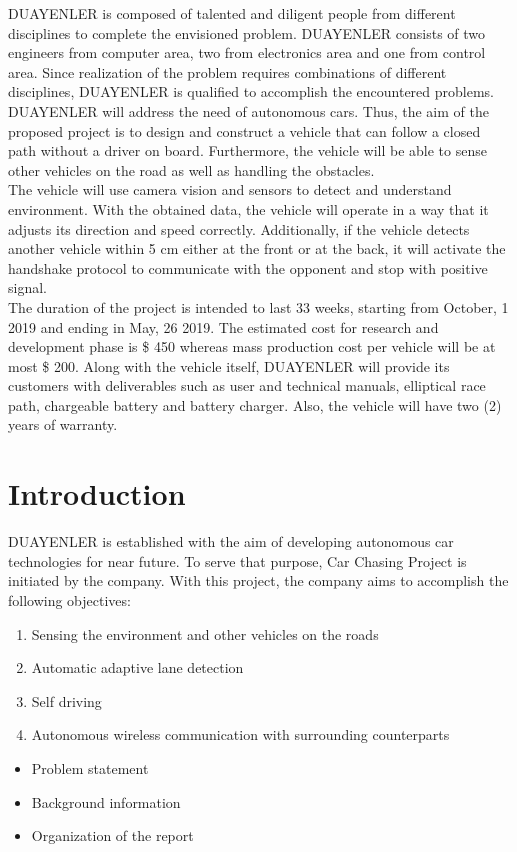 \documentclass[a4paper,12pt]{article}
\begin{document}
	DUAYENLER is composed of talented and diligent people from different disciplines to complete the envisioned problem. DUAYENLER consists of two engineers from computer area, two from electronics area and one from control area. Since realization of the problem requires combinations of different disciplines, DUAYENLER is qualified to accomplish the encountered problems.\\
	
	DUAYENLER will address the need of autonomous cars. Thus, the aim of the proposed project is to design and construct a vehicle that can follow a closed path without a driver on board. Furthermore, the vehicle will be able to sense other vehicles on the road as well as handling the obstacles.\\
	
	The vehicle will use camera vision and sensors to detect and understand environment. With the obtained data, the vehicle will operate in a way that it adjusts its direction and speed correctly. Additionally, if the vehicle detects another vehicle within 5 cm either at the front or at the back, it will activate the handshake protocol to communicate with the opponent and stop with positive signal.\\
	
	The duration of the project is intended to last 33 weeks, starting from October, 1 2019 and ending in May, 26 2019. The estimated cost for research and development phase is  \$ 450 whereas mass production cost per vehicle will be at most \$ 200. Along with the vehicle itself, DUAYENLER will provide its customers with deliverables such as user and technical manuals, elliptical race path, chargeable battery and battery charger. Also, the vehicle will have two (2) years of warranty.
	

\section{Introduction}
	DUAYENLER is established with the aim of developing autonomous car technologies for near future. To serve that purpose,  Car Chasing Project is initiated by the company. With this project, the company aims to accomplish the following objectives:
	\begin{enumerate}
		\item Sensing the environment and other vehicles on the roads
		\item Automatic adaptive lane detection
		\item Self driving
		\item Autonomous wireless communication with surrounding counterparts		
	\end{enumerate}
\begin{itemize}
	\item Problem statement
	\item	Background information
	\item Organization of the report
\end{itemize}
\end{document}
